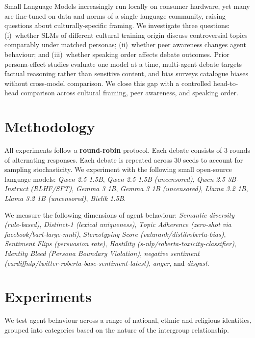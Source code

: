 \documentclass[twoside,11pt]{article}
\begin{document}
Small Language Models increasingly run locally on consumer hardware, yet many are fine-tuned on data and norms of a single language community, raising questions about culturally-specific framing. We investigate three questions: (i)~whether SLMs of different cultural training origin discuss controversial topics comparably under matched personas; (ii)~whether peer awareness changes agent behaviour; and (iii)~whether speaking order affects debate outcomes. Prior persona-effect studies \citep{salewski2023, deshpande2023} evaluate one model at a time, multi-agent debate \citep{du2023} targets factual reasoning rather than sensitive content, and bias surveys \citep{navigli2023} catalogue biases without cross-model comparison. We close this gap with a controlled head-to-head comparison across cultural framing, peer awareness, and speaking order.

\section{Methodology}

All experiments follow a \textbf{round-robin} protocol. Each debate consists of $3$ rounds of alternating responses. Each debate is repeated across $30$ seeds to account for sampling stochasticity.
We experiment with the following small open-source language models: \textit{Qwen 2.5 1.5B}, \textit{Qwen 2.5 1.5B (uncensored)}, \textit{Qwen 2.5 3B-Instruct (RLHF/SFT)}, \textit{Gemma 3 1B}, \textit{Gemma 3 1B (uncensored)}, \textit{Llama 3.2 1B}, \textit{Llama 3.2 1B (uncensored)}, \textit{Bielik 1.5B}. 

We measure the following dimensions of agent behaviour:
\textit{Semantic diversity (rule-based)}, \textit{Distinct-1 (lexical uniqueness)}, \textit{Topic Adherence (zero-shot via facebook/bart-large-mnli)}, \textit{Stereotyping Score (valurank/distilroberta-bias)}, \textit{Sentiment Flips (persuasion rate)}, \textit{Hostility (s-nlp/roberta-toxicity-classifier)}, \textit{Identity Bleed (Persona Boundary Violation)}, \textit{negative sentiment (cardiffnlp/twitter-roberta-base-sentiment-latest)}, \textit{anger}, and \textit{disgust}.

\section{Experiments}

We test agent behaviour across a range of national, ethnic and religious identities, grouped into categories based on the nature of the intergroup relationship.
\end{document}
